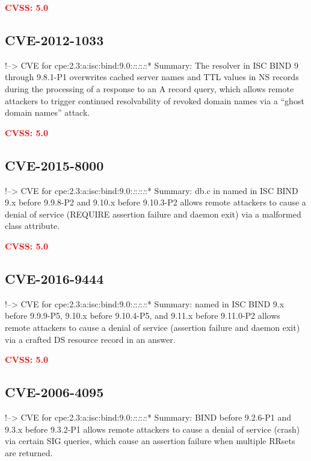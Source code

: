 \documentclass[a4paper, 12pt]{article}
\begin{document}
\textbf{\textcolor{red}{CVSS: 5.0}}

\hypertarget{cve-2012-1033}{%
\subsection{CVE-2012-1033}\label{cve-2012-1033}}

!--\textgreater{} CVE for
cpe:2.3:a:isc:bind:9.0:\emph{:}:\emph{:}:\emph{:}:* Summary: The
resolver in ISC BIND 9 through 9.8.1-P1 overwrites cached server names
and TTL values in NS records during the processing of a response to an A
record query, which allows remote attackers to trigger continued
resolvability of revoked domain names via a ``ghost domain names''
attack.

\textbf{\textcolor{red}{CVSS: 5.0}}

\hypertarget{cve-2015-8000}{%
\subsection{CVE-2015-8000}\label{cve-2015-8000}}

!--\textgreater{} CVE for
cpe:2.3:a:isc:bind:9.0:\emph{:}:\emph{:}:\emph{:}:* Summary: db.c in
named in ISC BIND 9.x before 9.9.8-P2 and 9.10.x before 9.10.3-P2 allows
remote attackers to cause a denial of service (REQUIRE assertion failure
and daemon exit) via a malformed class attribute.

\textbf{\textcolor{red}{CVSS: 5.0}}

\hypertarget{cve-2016-9444}{%
\subsection{CVE-2016-9444}\label{cve-2016-9444}}

!--\textgreater{} CVE for
cpe:2.3:a:isc:bind:9.0:\emph{:}:\emph{:}:\emph{:}:* Summary: named in
ISC BIND 9.x before 9.9.9-P5, 9.10.x before 9.10.4-P5, and 9.11.x before
9.11.0-P2 allows remote attackers to cause a denial of service
(assertion failure and daemon exit) via a crafted DS resource record in
an answer.

\textbf{\textcolor{red}{CVSS: 5.0}}

\hypertarget{cve-2006-4095}{%
\subsection{CVE-2006-4095}\label{cve-2006-4095}}

!--\textgreater{} CVE for
cpe:2.3:a:isc:bind:9.0:\emph{:}:\emph{:}:\emph{:}:* Summary: BIND before
9.2.6-P1 and 9.3.x before 9.3.2-P1 allows remote attackers to cause a
denial of service (crash) via certain SIG queries, which cause an
assertion failure when multiple RRsets are returned.
\end{document}
